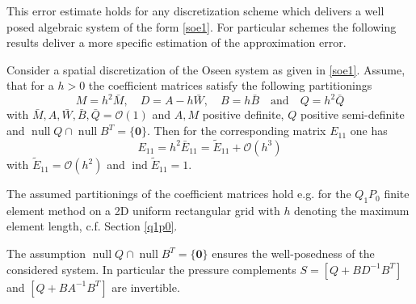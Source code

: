 \documentclass[a4paper,10pt,BCOR=15mm]{scrbook}
\DeclareMathOperator{\nulli}{null}
\DeclareMathOperator{\ind}{ind}
\providecommand{\andi}[0]{\quad \text{and} \quad}
\begin{document}
This error estimate holds for any discretization scheme which delivers a well posed algebraic system of the form \eqref{soe1}. For particular schemes the following results deliver a more specific estimation of the approximation error.

\begin{lem}\label{epert}
Consider a spatial discretization of the Oseen system as given in \eqref{soe1}. Assume, that for a $h > 0$ the coefficient matrices satisfy the following partitionings
\begin{equation*}
 M = h^2\bar M,\quad  D = A - h \bar W, \quad B = h \bar B \andi Q = h^2 \bar Q
\end{equation*}
with $\bar M, A , \bar W, \bar B,\bar Q = \mathcal O(1)$ and $A,M$ positive definite, $Q$ positive semi-definite and $ \nulli Q \cap \nulli B^T = \{ \mathbf 0 \}$. Then for the corresponding matrix $E_{11}$ one has
\begin{equation*}
 E_{11} = h^2\bar E_{11} = \tilde E_{11}  + \mathcal O(h^3)
\end{equation*}
with $\tilde E_{11} = \mathcal O(h^2)$ and $\ind \tilde E_{11} = 1$.
\end{lem}

\begin{rem}
 The assumed partitionings of the coefficient matrices hold e.g. for the $Q_1P_0$ finite element method on a 2D uniform rectangular grid with $h$ denoting the maximum element length, c.f. Section \ref{q1p0}.
\end{rem}

\begin{rem}
 The assumption $ \nulli Q \cap \nulli B^T = \{ \mathbf 0 \}$ ensures the well-posedness of the considered system. In particular the pressure complements $S=[Q + BD^{-1}B^T]$ and $[Q+BA^{-1}B^T]$ are invertible.
\end{rem}
\end{document}
